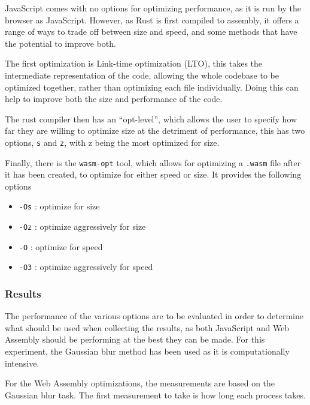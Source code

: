\documentclass[12pt,a4paper]{article}
\begin{document}
JavaScript comes with no options for optimizing performance, as it is run by the browser as JavaScript. However, as Rust is first compiled to assembly, it offers a range of ways to trade off between size and speed, and some methods that have the potential to improve both.

The first optimization is Link-time optimization (LTO), this takes the intermediate representation of the code, allowing the whole codebase to be optimized together, rather than optimizing each file individually. Doing this can help to improve both the size and performance of the code.

The rust compiler then has an “opt-level”, which allows the user to specify how far they are willing to optimize size at the detriment of performance, this has two options, \texttt{s} and \texttt{z}, with z being the most optimized for size.

Finally, there is the \texttt{wasm-opt} tool, which allows for optimizing a \texttt{.wasm} file after it has been created, to optimize for either speed or size. It provides the following options

\begin{itemize}
    \item \texttt{-Os} : optimize for size
    \item \texttt{-Oz} : optimize aggressively for size
    \item \texttt{-O} : optimize for speed
    \item \texttt{-O3} : optimize aggressively for speed
\end{itemize}

\subsubsection{Results}

The performance of the various options are to be evaluated in order to determine what should be used when collecting the results, as both JavaScript and Web Assembly should be performing at the best they can be made. For this experiment, the Gaussian blur method has been used as it is computationally intensive.

For the Web Assembly optimizations, the measurements are based on the Gaussian blur task. The first measurement to take is how long each process takes.
\end{document}

